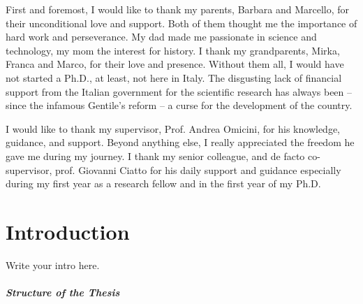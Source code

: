 \documentclass[12pt,a4paper,openright,twoside]{book}
\begin{document}
\begin{acknowledgements} %
    First and foremost, I would like to thank my parents, Barbara and Marcello, for their unconditional love and support.
    Both of them thought me the importance of hard work and perseverance.
    My dad made me passionate in science and technology, my mom the interest for history.
    I thank my grandparents, Mirka, Franca and Marco, for their love and presence.
    Without them all, I would have not started a Ph.D., at least, not here in Italy.
    The disgusting lack of financial support from the Italian government for the scientific research has always been -- since the infamous Gentile's reform -- a curse for the development of the country.

    I would like to thank my supervisor, Prof. Andrea Omicini, for his knowledge, guidance, and support.
    Beyond anything else, I really appreciated the freedom he gave me during my journey.
    I thank my senior colleague, and de facto co-supervisor, prof. Giovanni Ciatto for his daily support and guidance especially during my first year as a research fellow and in the first year of my Ph.D.


\end{acknowledgements}

\tableofcontents   
\listoffigures     %
\lstlistoflistings %

\mainmatter

\chapter{Introduction}
\label{chap:introduction}

Write your intro here.

\paragraph{Structure of the Thesis}

\end{document}
